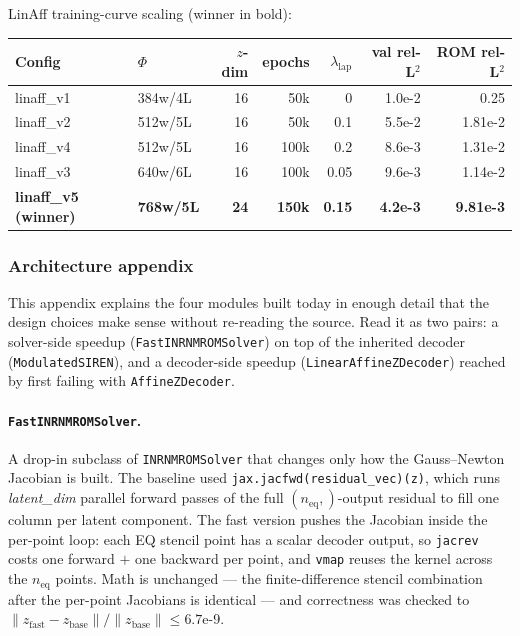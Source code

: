LinAff training-curve scaling (winner in bold):

\begin{center}
\begin{tabular}{l l r r r r r}
  \textbf{Config} & \textbf{$\Phi$} & \textbf{$z$-dim} & \textbf{epochs} & \textbf{$\lambda_{\text{lap}}$} & \textbf{val rel-L$^2$} & \textbf{ROM rel-L$^2$} \\
  \hline
  linaff\_v1 & 384w/4L & 16 & 50k  & 0     & 1.0e-2  & 0.25    \\
  linaff\_v2 & 512w/5L & 16 & 50k  & 0.1   & 5.5e-2  & 1.81e-2 \\
  linaff\_v4 & 512w/5L & 16 & 100k & 0.2   & 8.6e-3  & 1.31e-2 \\
  linaff\_v3 & 640w/6L & 16 & 100k & 0.05  & 9.6e-3  & 1.14e-2 \\
  \textbf{linaff\_v5 (winner)} & \textbf{768w/5L} & \textbf{24} & \textbf{150k} & \textbf{0.15} & \textbf{4.2e-3} & \textbf{9.81e-3} \\
\end{tabular}
\end{center}

\subsubsection*{Architecture appendix}

This appendix explains the four modules built today in enough detail that
the design choices make sense without re-reading the source. Read it as
two pairs: a solver-side speedup (\texttt{FastINRNMROMSolver}) on top of
the inherited decoder (\texttt{ModulatedSIREN}), and a decoder-side
speedup (\texttt{LinearAffineZDecoder}) reached by first failing with
\texttt{AffineZDecoder}.

\paragraph{\texttt{FastINRNMROMSolver}.}
A drop-in subclass of \texttt{INRNMROMSolver} that changes only how the
Gauss--Newton Jacobian is built. The baseline used
\texttt{jax.jacfwd(residual\_vec)(z)}, which runs \emph{latent\_dim}
parallel forward passes of the full $(n_{\text{eq}},)$-output residual
to fill one column per latent component. The fast version pushes the
Jacobian inside the per-point loop: each EQ stencil point has a scalar
decoder output, so \texttt{jacrev} costs one forward $+$ one backward
per point, and \texttt{vmap} reuses the kernel across the
$n_{\text{eq}}$ points. Math is unchanged --- the finite-difference
stencil combination after the per-point Jacobians is identical --- and
correctness was checked to $\|z_{\text{fast}}-z_{\text{base}}\| /
\|z_{\text{base}}\| \le 6.7$e-9.


